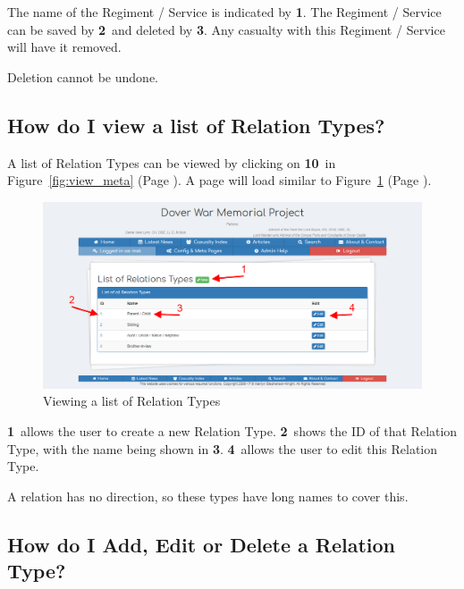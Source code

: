 \documentclass[12pt]{article}
\newcommand{\marker}[1]{\color{red}\textbf{#1}\color{black}}
\newcommand{\myref}[1]{\ref{#1} {\scriptsize(Page \pageref{#1})}}
\begin{document}
The name of the Regiment / Service is indicated by \marker{1}. The Regiment / Service can be saved by \marker{2}\ and deleted by \marker{3}. Any casualty with this Regiment / Service will have it removed.

\begin{warningBox}
Deletion cannot be undone.
\end{warningBox} 


\newpage
\FloatBarrier
\subsection{How do I view a list of Relation Types?} \label{ssec:view_relation}

A list of Relation Types can be viewed by clicking on \marker{10}\ in Figure~\myref{fig:view_meta}. A page will load similar to Figure~\myref{fig:view_relation}.

\begin{figure}[h]
  \centering
 \includegraphics[width=.9\textwidth]{pics/view_relation.png}
	\caption{Viewing a list of Relation Types}\label{fig:view_relation}
\end{figure}

\marker{1}\ allows the user to create a new Relation Type. \marker{2}\ shows the ID of that Relation Type, with the name being shown in \marker{3}. \marker{4}\ allows the user to edit this Relation Type.

\begin{infoBox}
A relation has no direction, so these types have long names to cover this.
\end{infoBox}

\newpage
\FloatBarrier
\subsection{How do I Add, Edit or Delete a Relation Type?} \label{ssec:edit_relation}
\end{document}
